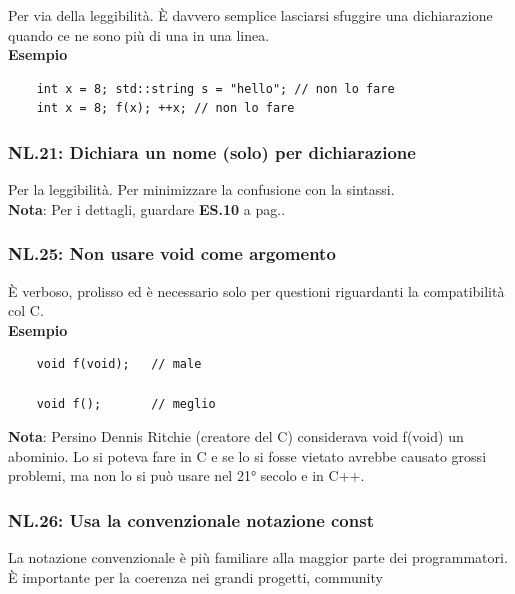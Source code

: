 \textsf{\small Per via della leggibilità. È davvero semplice lasciarsi sfuggire una dichiarazione quando ce ne sono più di una in una linea.} \\

\textsf{\small \textbf{Esempio}}

\begin{lstlisting}
	int x = 8; std::string s = "hello"; // non lo fare
	int x = 8; f(x); ++x; // non lo fare
\end{lstlisting}

\subsubsection{NL.21: Dichiara un nome (solo) per dichiarazione}

\textsf{\small Per la leggibilità. Per minimizzare la confusione con la sintassi.} \\ %

\textsf{\small \textbf{Nota}: Per i dettagli, guardare \textbf{ES.10} a pag.\textbf{\pageref{ES_10}}.} \\

\subsubsection{NL.25: Non usare void come argomento}

\textsf{\small È verboso, prolisso ed è necessario solo per questioni riguardanti la compatibilità col C.} \\

\textsf{\small \textbf{Esempio}}

\begin{lstlisting}
	void f(void);   // male
	
	void f();       // meglio
\end{lstlisting}

\textsf{\small \textbf{Nota}: Persino Dennis Ritchie (creatore del C) considerava void f(void) un abominio. Lo si poteva fare in C e se lo si fosse vietato avrebbe causato grossi problemi, ma non lo si può usare nel 21° secolo e in C++. } \\

\subsubsection{NL.26: Usa la convenzionale notazione const}

\textsf{\small La notazione convenzionale è più familiare alla maggior parte dei programmatori. È importante per la coerenza nei grandi progetti, community} \\

